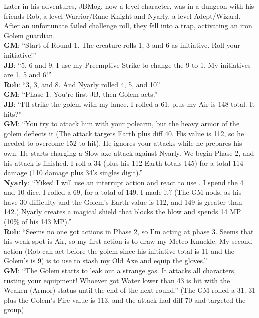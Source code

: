 \begin{multimog}
    Later in his adventures, JBMog, now a  level character, was in a dungeon with his friends Rob, a  level Warrior/Rune Knight and Nyarly, a  level Adept/Wizard. After an unfortunate failed challenge roll, they fell into a trap, activating an iron Golem guardian. \\
    \textbf{GM}: \enquote{Start of Round 1. The creature rolls 1, 3 and 6 as initiative. Roll your initiative!} \\
    \textbf{JB}: \enquote{5, 6 and 9. I use my Preemptive Strike to change the 9 to 1. My initiatives are 1, 5 and 6!} \\
    \textbf{Rob}: \enquote{3, 3, and 8. And Nyarly rolled 4, 5, and 10} \\
    \textbf{GM}: \enquote{Phase 1. You're first JB, then Golem acts.} \\
    \textbf{JB}: \enquote{I'll strike the golem with my lance. I rolled a 61, plus my Air is 148 total. It hits?} \\
    \textbf{GM}: \enquote{You try to attack him with your polearm, but the heavy armor of the golem deflects it (The attack targets Earth plus diff 40. His value is 112, so he needed to overcome 152 to hit). He ignores your attacks while he prepares his own. He starts charging a Slow axe attack against Nyarly. We begin Phase 2, and his attack is finished. I roll a 34 (plus his 112 Earth totals 145) for a total 114 damage (110 damage plus 34's singles digit).} \\
    \textbf{Nyarly}: \enquote{Yikes! I will use an interrupt action and react to use . I spend the 4 and 10 dice. I rolled a 69, for a total of 149. I made it? (The GM nods, as his  have 30 difficulty and the Golem's Earth value is 112, and 149 is greater than 142.) Nyarly creates a magical shield that blocks the blow and spends 14 MP (10\% of his 143 MP).} \\
    \textbf{Rob}: \enquote{Seems no one got actions in Phase 2, so I'm acting at phase 3. Seems that his weak spot is Air, so my first action is to draw my Meteo Knuckle. My second action (Rob can act before the golem since his initiative total is 11 and the Golem's is 9) is to use  to stash my Old Axe and equip the gloves.} \\
    \textbf{GM}: \enquote{The Golem starts to leak out a strange gas. It attacks all characters, rusting your equipment! Whoever got Water lower than 43 is hit with the Weaken (Armor) status until the end of the next round.} (The GM rolled a 31. 31 plus the Golem's Fire value is 113, and the attack had diff 70 and targeted the group) \\

\end{multimog}
